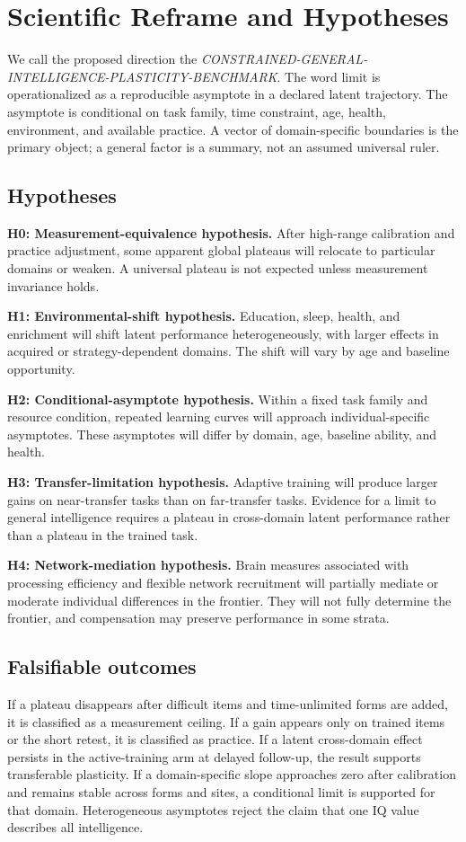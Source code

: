 \documentclass[conference]{IEEEtran}
\begin{document}
\section{Scientific Reframe and Hypotheses}
\label{sec:idea}
We call the proposed direction the \emph{CONSTRAINED-GENERAL-INTELLIGENCE-PLASTICITY-BENCHMARK}. The word limit is operationalized as a reproducible asymptote in a declared latent trajectory. The asymptote is conditional on task family, time constraint, age, health, environment, and available practice. A vector of domain-specific boundaries is the primary object; a general factor is a summary, not an assumed universal ruler.

\subsection{Hypotheses}
\textbf{H0: Measurement-equivalence hypothesis.} After high-range calibration and practice adjustment, some apparent global plateaus will relocate to particular domains or weaken. A universal plateau is not expected unless measurement invariance holds.

\textbf{H1: Environmental-shift hypothesis.} Education, sleep, health, and enrichment will shift latent performance heterogeneously, with larger effects in acquired or strategy-dependent domains. The shift will vary by age and baseline opportunity.

\textbf{H2: Conditional-asymptote hypothesis.} Within a fixed task family and resource condition, repeated learning curves will approach individual-specific asymptotes. These asymptotes will differ by domain, age, baseline ability, and health.

\textbf{H3: Transfer-limitation hypothesis.} Adaptive training will produce larger gains on near-transfer tasks than on far-transfer tasks. Evidence for a limit to general intelligence requires a plateau in cross-domain latent performance rather than a plateau in the trained task.

\textbf{H4: Network-mediation hypothesis.} Brain measures associated with processing efficiency and flexible network recruitment will partially mediate or moderate individual differences in the frontier. They will not fully determine the frontier, and compensation may preserve performance in some strata.

\subsection{Falsifiable outcomes}
If a plateau disappears after difficult items and time-unlimited forms are added, it is classified as a measurement ceiling. If a gain appears only on trained items or the short retest, it is classified as practice. If a latent cross-domain effect persists in the active-training arm at delayed follow-up, the result supports transferable plasticity. If a domain-specific slope approaches zero after calibration and remains stable across forms and sites, a conditional limit is supported for that domain. Heterogeneous asymptotes reject the claim that one IQ value describes all intelligence.
\end{document}
